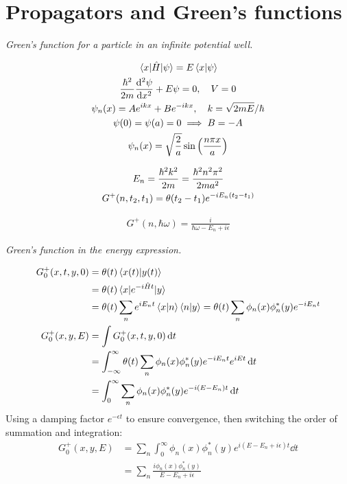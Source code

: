 \documentclass{report}
\begin{document}
\chapter{Propagators and Green's functions}
\begin{subquests}
	\item \emph{Green's function for a particle in an infinite potential well.}
	\begin{subquests}
		\item
		\begin{gather*}
			\mel{x}{\hat{H}}{\psi} = E\braket{x}{\psi} \\
			\frac{\hbar^2}{2m}\dv[2]{\psi}{x} + E{\psi} = 0, \quad V = 0 \\
			\psi_n(x) = Ae^{ikx} + Be^{-ikx},\quad k = \sqrt{2mE}/\hbar \\
			\psi(0) = \psi(a) = 0 \implies B = -A \\
			\psi_n(x) = \sqrt{\frac{2}{a}}\sin\pqty{\frac{n\pi x}{a}}
		\end{gather*}

		\item
		\begin{gather*}
			E_n = \frac{\hbar^2k^2}{2m} = \frac{\hbar^2n^2\pi^2}{2ma^2} \\
			G^+(n,t_2,t_1) = \theta(t_2 - t_1)e^{-iE_n\pqty{t_2 - t_1}}
		\end{gather*}

		\item
		\begin{gather*}
			G^+(n,\hbar\omega) = \frac{i}{\hbar\omega - E_n + i\epsilon}
		\end{gather*}
	\end{subquests}
	\newpage
	\item \emph{Green's function in the energy expression.}
	\begin{subquests}
		\item 
		\begin{align*}
			G^+_0(x,t,y,0) & = \theta(t)\ip{x(t)}{y(t)} \\
			& = \theta(t)\mel{x}{e^{-i\hat Ht}}{y} \\
			& = \theta(t)\sum_n e^{iE_n t}\ip{x}{n}\ip{n}{y} = \theta(t)\sum_n\phi_{n}(x)\phi_n^*(y)e^{-iE_n t} \\
			G^+_0(x,y,E) & = \int G^+_0(x,t,y,0) \dd{t} \\
			& = \int_{-\infty}^{\infty} \theta(t)\sum_n\phi_{n}(x)\phi_n^*(y)e^{-iE_n t}e^{iEt} \dd{t} \\
			& = \int_{0}^{\infty} \sum_n\phi_{n}(x)\phi_n^*(y)e^{-i(E-E_n)t} \dd{t}
		\end{align*}
		Using a damping factor $e^{-\epsilon t}$ to ensure convergence, then switching the order of summation and integration:
		\begin{align*}
			G^+_0(x,y,E) & = \sum_n\int_{0}^{\infty}\phi_{n}(x)\phi_n^*(y)e^{i(E - E_n + i\epsilon)t} \dd{t}\\
			& = \sum_n \frac{i\phi_{n}(x)\phi_n^*(y)}{E - E_n + i\epsilon}
		\end{align*}
		

\end{subquests}
\end{subquests}
\end{document}
